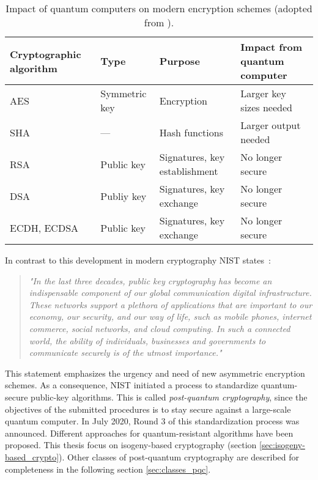 \begin{table}[H]
  \centering
  \begin{tabular}{|K{3cm}|K{3cm}|K{4cm}|K{4cm}|}
	\hline
      \textbf{Cryptographic} \textbf{algorithm} & \textbf{Type} & \textbf{Purpose} & \textbf{Impact from} \textbf{ quantum computer} \\
	\hline
      AES & Symmetric key & Encryption & Larger key sizes needed \\
    \hline
      SHA & --- & Hash functions & Larger output needed \\
    \hline
      \gls{RSA} & Public key & Signatures, key establishment & No longer secure \\
	\hline      
      DSA & Publiy key & Signatures, key exchange & No longer secure \\
    \hline
      \gls{ECDH}, ECDSA & Public key & Signatures, key exchange & No longer secure \\
    \hline
  \end{tabular}
  \caption[Impact of quantum computers on modern encryption schemes]{Impact of quantum computers on modern encryption schemes (adopted from \parencite{chen2016report}).}\label{tab:impact}
\end{table}

In contrast to this development in modern cryptography NIST states~\parencite{chen2016report}:
\begin{quote}
\textit{"In the last three decades, public key cryptography has become an indispensable component of our global communication digital infrastructure. These networks support a plethora of applications that are important to our economy, our security, and our way of life, such as mobile phones, internet commerce, social networks, and cloud computing. In such a connected world, the ability of individuals, businesses and governments to communicate securely is of the utmost importance."}
\end{quote}
This statement emphasizes the urgency and need of new asymmetric encryption schemes. As a consequence, NIST initiated a process to standardize quantum-secure public-key algorithms. This is called \textit{post-quantum cryptography}, since the objectives of the submitted procedures is to stay secure against a large-scale quantum computer. In July 2020, Round 3 of this standardization process was announced. Different approaches for quantum-resistant algorithms have been proposed. This thesis focus on isogeny-based cryptography (section \ref{sec:isogeny-based_crypto}). Other classes of post-quantum cryptography are described for completeness in the following section \ref{sec:classes_pqc}.

